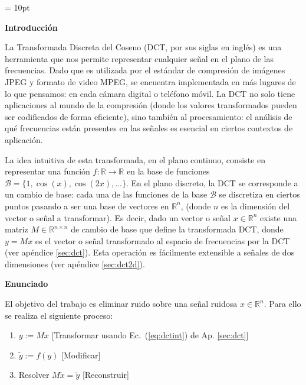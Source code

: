 \parskip = 10pt

\newcommand{\real}{\mathbb{R}}

{\bf Introducci\'on}

La Transformada Discreta del Coseno  (DCT, por sus siglas en ingl\'es) es una herramienta que nos permite representar cualquier se\~nal en el plano de las frecuencias. Dado que es utilizada por el est\'andar de compresi\'on de im\'agenes JPEG y formato de video MPEG, se encuentra implementada en m\'as lugares de lo que pensamos: en cada c\'amara digital o tel\'efono m\'ovil. 
La DCT no solo tiene aplicaciones al mundo de la compresi\'on (donde los valores transformados pueden ser codificados de forma eficiente), sino tambi\'en al procesamiento: el an\'alisis de qu\'e frecuencias est\'an presentes en las se\~nales es esencial en ciertos contextos de aplicaci\'on.

La idea intuitiva de esta transformada, en el plano continuo, consiste en representar una funci\'on $f: \mathbb{R} \rightarrow \mathbb{R}$ en la base de funciones $\mathcal{B}=\{1, \cos(x), \cos(2x),...\}$.
En el plano discreto, la DCT se corresponde a un cambio de base: cada una de las funciones de la base $\mathcal{B}$ se discretiza en ciertos puntos pasando a ser una base de vectores en $\mathbb{R}^n$, (donde $n$ es la dimensi\'on del vector o se\~nal a transformar).
Es decir, dado un vector o se\~nal $x\in\mathbb{R}^n$ existe una matriz $M\in\mathbb{R}^{n\times n}$ de cambio de base que define la transformada DCT, donde $y=Mx$ es el vector o se\~nal transformado al espacio de frecuencias por la DCT (ver ap\'endice \ref{sec:dct}). Esta operaci\'on es f\'acilmente extensible a se\~nales de dos dimensiones (ver ap\'endice \ref{sec:dct2d}).


{\bf Enunciado}

El objetivo del trabajo es eliminar ruido sobre una se\~nal ruidosa $x\in\real^{n}$. Para ello se realiza el siguiente proceso: 
\begin{enumerate}
\item  $y:=Mx$ [Transformar usando Ec.~(\ref{eq:dctint}) de Ap. \ref{sec:dct}]
\item $\tilde{y} := f(y)$ [Modificar]
\item Resolver $M \tilde{x} = \tilde{y}$ [Reconstruir]
\end{enumerate}

